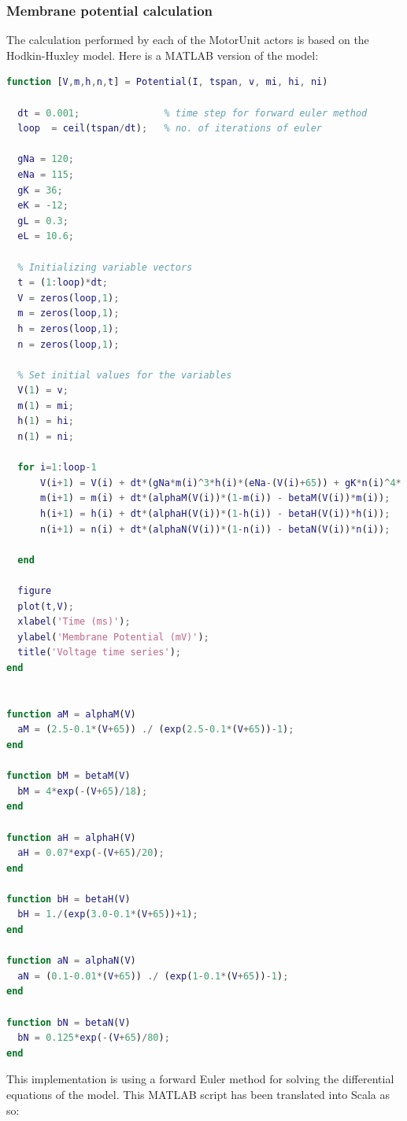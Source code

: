 \documentclass[titlepage]{article}
\begin{document}
\subsubsection{Membrane potential calculation}
\label{sec:calc}
The calculation performed by each of the MotorUnit actors is based on the Hodkin-Huxley model. Here is a MATLAB version of the model:
\begin{lstlisting}[language=MATLAB]
function [V,m,h,n,t] = Potential(I, tspan, v, mi, hi, ni)   

  dt = 0.001;               % time step for forward euler method
  loop  = ceil(tspan/dt);   % no. of iterations of euler
  
  gNa = 120;  
  eNa = 115;
  gK = 36;  
  eK = -12;
  gL = 0.3;  
  eL = 10.6;
 
  % Initializing variable vectors
  t = (1:loop)*dt;
  V = zeros(loop,1);
  m = zeros(loop,1);
  h = zeros(loop,1);
  n = zeros(loop,1);

  % Set initial values for the variables
  V(1) = v;
  m(1) = mi;
  h(1) = hi;
  n(1) = ni;
   
  for i=1:loop-1 
      V(i+1) = V(i) + dt*(gNa*m(i)^3*h(i)*(eNa-(V(i)+65)) + gK*n(i)^4*(eK-(V(i)+65)) + gL*(eL-(V(i)+65)) + I);
      m(i+1) = m(i) + dt*(alphaM(V(i))*(1-m(i)) - betaM(V(i))*m(i));
      h(i+1) = h(i) + dt*(alphaH(V(i))*(1-h(i)) - betaH(V(i))*h(i));
      n(i+1) = n(i) + dt*(alphaN(V(i))*(1-n(i)) - betaN(V(i))*n(i));
      
  end
  
  figure
  plot(t,V);
  xlabel('Time (ms)');
  ylabel('Membrane Potential (mV)');
  title('Voltage time series');
end


function aM = alphaM(V)
  aM = (2.5-0.1*(V+65)) ./ (exp(2.5-0.1*(V+65))-1);
end

function bM = betaM(V)
  bM = 4*exp(-(V+65)/18);
end

function aH = alphaH(V)
  aH = 0.07*exp(-(V+65)/20);
end

function bH = betaH(V)
  bH = 1./(exp(3.0-0.1*(V+65))+1);
end

function aN = alphaN(V)
  aN = (0.1-0.01*(V+65)) ./ (exp(1-0.1*(V+65))-1);
end

function bN = betaN(V)
  bN = 0.125*exp(-(V+65)/80);
end
\end{lstlisting}
This implementation is using a forward Euler method for solving the differential equations of the model. This MATLAB script has been translated into Scala as so:
\end{document}
